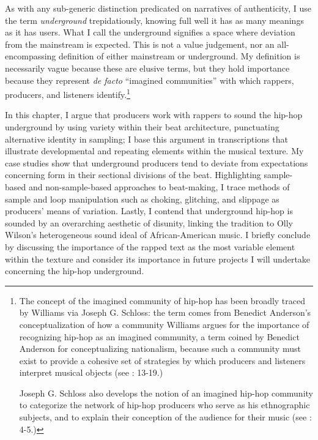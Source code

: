 As with any sub-generic distinction predicated on narratives of authenticity, I use the term \emph{underground} trepidatiously, knowing full well it has as many meanings as it has users. What I call the underground signifies a space where deviation from the mainstream is expected. This is not a value judgement, nor an all-encompassing definition of either mainstream or underground. My definition is necessarily vague because these are elusive terms, but they hold importance because they represent \textit{de facto} ``imagined communities'' with which rappers, producers, and listeners identify.\footnote{The concept of the imagined community of hip-hop has been broadly traced by Williams via Joseph G. Schloss: the term comes from Benedict Anderson's conceptualization of how a community 
Williams argues for the importance of recognizing hip-hop as an imagined community, a term coined by Benedict Anderson for conceptualizing nationalism, because such a community must exist to provide a cohesive set of strategies by which producers and listeners interpret musical objects (see \cite{justinawilliamsRhyminStealinMusical2013}: 13-19.) 

Joseph G. Schloss also develops the notion of an imagined hip-hop community to categorize the network of hip-hop producers who serve as his ethnographic subjects, and to explain their conception of the audience for their music (see \cite{josephgschlossMakingBeatsArt2004}: 4-5.)}

In this chapter, I argue that producers work with rappers to sound the hip-hop underground by using variety within their beat architecture, punctuating alternative identity in sampling; I base this argument in transcriptions that illustrate developmental and repeating elements within the musical texture. My case studies show that underground producers tend to deviate from expectations concerning form in their sectional divisions of the beat. Highlighting sample-based and non-sample-based approaches to beat-making, I trace methods of sample and loop manipulation such as choking, glitching, and slippage as producers' means of variation. Lastly, I contend that underground hip-hop is sounded by an overarching aesthetic of disunity, linking the tradition to Olly Wilson's heterogeneous sound ideal of African-American music. I briefly conclude by discussing the importance of the rapped text as the most variable element within the texture and consider its importance in future projects I will undertake concerning the hip-hop underground.
\clearpage

